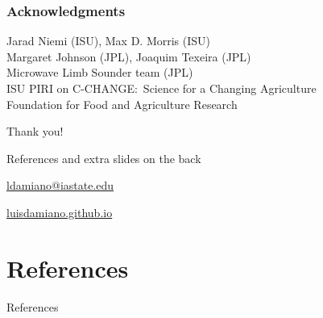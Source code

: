 \documentclass{snedecorbeamer}
\begin{document}
\begin{frame}[c]
  \frametitle{Acknowledgments}
  \centering

  {\small Jarad Niemi (ISU), Max D. Morris (ISU)\\
    Margaret Johnson (JPL), Joaquim Texeira (JPL) \\
    Microwave Limb Sounder team (JPL)\\
    ISU PIRI on C-CHANGE:~Science for a Changing Agriculture\\
    Foundation for Food and Agriculture Research}

  \vfill

  {\huge Thank you!}

  \vfill

  {\tiny References and extra slides on the back}

  \href{ldamiano@iastate.edu}{
    ldamiano@iastate.edu}

  \href{https://luisdamiano.github.io/}{
    luisdamiano.github.io}

  \vfill

\end{frame}

\appendix

\section{References}


\begin{frame}[allowframebreaks]{References}
  \tiny
  
  
\end{frame}
\end{document}
